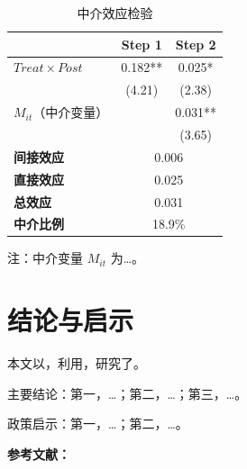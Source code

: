 \documentclass[lang=cn, aaffiliation={中国}]{ctexart}
\begin{document}
\begin{table}[htbp]
    \centering
    \caption{中介效应检验}
    \label{tab:mediation}
    \begin{threeparttable}
        \begin{tabular}{lcc}
            \toprule
            \textbf{} & \textbf{Step 1} & \textbf{Step 2} \\
            \midrule
            $Treat \times Post$ & 0.182\*** & 0.025\** \\
              & (4.21) & (2.38) \\
            $M_{it}$（中介变量）& & 0.031\*** \\
              & & (3.65) \\
            \midrule
            \textbf{间接效应} & \multicolumn{2}{c}{0.006} \\
            \textbf{直接效应} & \multicolumn{2}{c}{0.025} \\
            \textbf{总效应} & \multicolumn{2}{c}{0.031} \\
            \textbf{中介比例} & \multicolumn{2}{c}{18.9\%} \\
            \bottomrule
        \end{tabular}
        \begin{tablenotes}\footnotesize
            \item 注：中介变量 $M_{it}$ 为\dots。
        \end{tablenotes}
    \end{threeparttable}
\end{table}

\section{结论与启示}
\label{sec:conclusion}

本文以，利用，研究了。

主要结论：第一，\dots；第二，\dots；第三，\dots。

政策启示：第一，\dots；第二，\dots。

\textbf{参考文献：}

\end{document}
